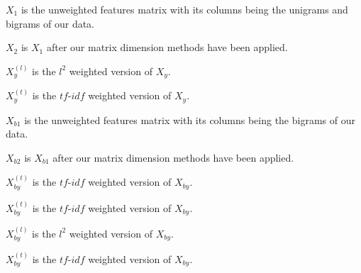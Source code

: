\documentclass{article}
\begin{document}
$X_1$ is the unweighted features matrix with its columns being the unigrams and bigrams of our data.

$X_2$ is $X_1$ after our matrix dimension methods have been applied.

$X_y^{(l)}$ is the $l^2$ weighted version of $X_y$.

$X_y^{(t)}$ is the $tf$-$idf$ weighted version of $X_y$.

$X_{b1}$ is the unweighted features matrix with its columns being the bigrams of our data.

$X_{b2}$ is $X_{b1}$ after our matrix dimension methods have been applied.

$X^{(t)}_{by}$ is the $tf$-$idf$ weighted version of $X_{by}$.

$X^{(t)}_{by}$ is the $tf$-$idf$ weighted version of $X_{by}$.

$X_{by}^{(l)}$ is the $l^2$ weighted version of $X_{by}$.

$X_{by}^{(t)}$ is the $tf$-$idf$ weighted version of $X_{by}$.
\end{document}
